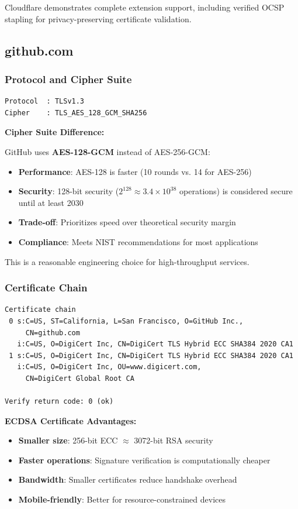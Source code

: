 \documentclass[12pt,a4paper]{article}
\begin{document}
Cloudflare demonstrates complete extension support, including verified OCSP stapling for privacy-preserving certificate validation.

\subsection{github.com}

\subsubsection{Protocol and Cipher Suite}

\begin{lstlisting}[style=outputstyle]
Protocol  : TLSv1.3
Cipher    : TLS_AES_128_GCM_SHA256
\end{lstlisting}

\textbf{Cipher Suite Difference:}

GitHub uses \textbf{AES-128-GCM} instead of AES-256-GCM:
\begin{itemize}
    \item \textbf{Performance}: AES-128 is faster (10 rounds vs. 14 for AES-256)
    \item \textbf{Security}: 128-bit security ($2^{128} \approx 3.4 \times 10^{38}$ operations) is considered secure until at least 2030
    \item \textbf{Trade-off}: Prioritizes speed over theoretical security margin
    \item \textbf{Compliance}: Meets NIST recommendations for most applications
\end{itemize}

This is a reasonable engineering choice for high-throughput services.

\subsubsection{Certificate Chain}

\begin{lstlisting}[style=outputstyle]
Certificate chain
 0 s:C=US, ST=California, L=San Francisco, O=GitHub Inc.,
     CN=github.com
   i:C=US, O=DigiCert Inc, CN=DigiCert TLS Hybrid ECC SHA384 2020 CA1
 1 s:C=US, O=DigiCert Inc, CN=DigiCert TLS Hybrid ECC SHA384 2020 CA1
   i:C=US, O=DigiCert Inc, OU=www.digicert.com,
     CN=DigiCert Global Root CA

Verify return code: 0 (ok)
\end{lstlisting}

\textbf{ECDSA Certificate Advantages:}
\begin{itemize}
    \item \textbf{Smaller size}: 256-bit ECC $\approx$ 3072-bit RSA security
    \item \textbf{Faster operations}: Signature verification is computationally cheaper
    \item \textbf{Bandwidth}: Smaller certificates reduce handshake overhead
    \item \textbf{Mobile-friendly}: Better for resource-constrained devices
\end{itemize}
\end{document}
